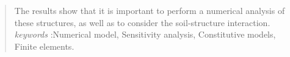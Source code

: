 \begin{quotation}
	
	
	

  
 \noindent 
  The results show that it is important to perform a numerical analysis of these structures, as well as to consider the soil-structure interaction.\\[0.10cm]
  
  \noindent \textit{keywords} :Numerical model, Sensitivity analysis, Constitutive models, Finite elements.
\end{quotation}






